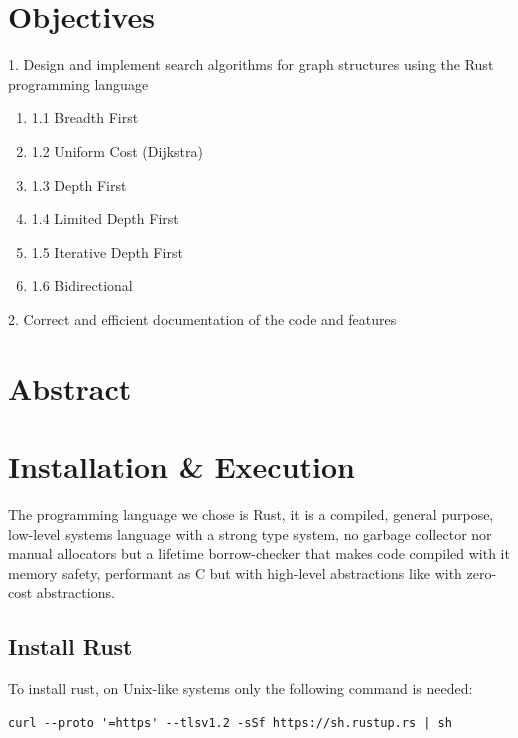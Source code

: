 \vfill

\newpage
{}
\tableofcontents

\newpage
\section{Objectives}

1. Design and implement search algorithms for graph structures using
the Rust programming language

\begin{enumerate}[label={}]
\item 1.1 Breadth First
\item 1.2 Uniform Cost (Dijkstra)
\item 1.3 Depth First
\item 1.4 Limited Depth First
\item 1.5 Iterative Depth First
\item 1.6 Bidirectional
\end{enumerate}



2. Correct and efficient documentation of the code and features


\section{Abstract}


\newpage
\section{Installation \& Execution}

The programming language we chose is Rust, it is a compiled,
general purpose, low-level systems language with a strong type system,
no garbage collector nor manual allocators but a lifetime borrow-checker that
makes code compiled with it memory safety, performant as C but with high-level
abstractions like with zero-cost abstractions.

\subsection{Install Rust}

To install rust, on Unix-like systems only the following command is needed:

\begin{verbatim}
curl --proto '=https' --tlsv1.2 -sSf https://sh.rustup.rs | sh
\end{verbatim}

